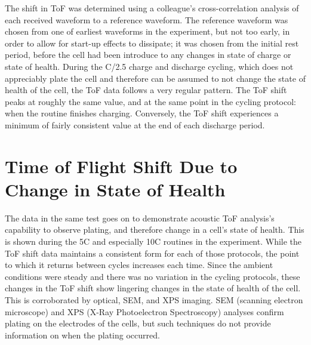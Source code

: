The shift in ToF was determined using a colleague's cross-correlation analysis of each received waveform to a reference waveform. The reference waveform was chosen from one of earliest waveforms in the experiment, but not too early, in order to allow for start-up effects to dissipate; it was chosen from the initial rest period, before the cell had been introduce to any changes in state of charge or state of health.
During the C/2.5 charge and discharge cycling, which does not appreciably plate the cell and therefore can be assumed to not change the state of health of the cell, the ToF data follows a very regular pattern. 
The ToF shift peaks at roughly the same value, and at the same point in the cycling protocol: when the routine finishes charging. 
Conversely, the ToF shift experiences a minimum of fairly consistent value at the end of each discharge period.

\section{Time of Flight Shift Due to Change in State of Health}
The data in the same test goes on to demonstrate acoustic ToF analysis's capability to observe plating, and therefore change in a cell's state of health. This is shown during the 5C and especially 10C routines in the experiment. 
While the ToF shift data maintains a consistent form for each of those protocols, the point to which it returns between cycles increases each time. 
Since the ambient conditions were steady and there was no variation in the cycling protocols, these changes in the ToF shift show lingering changes in the state of health of the cell. 
This is corroborated by optical, SEM, and XPS imaging. 
SEM (scanning electron microscope) and XPS (X-Ray Photoelectron Spectroscopy) analyses confirm plating on the electrodes of the cells, but such techniques do not provide information on when the plating occurred.

